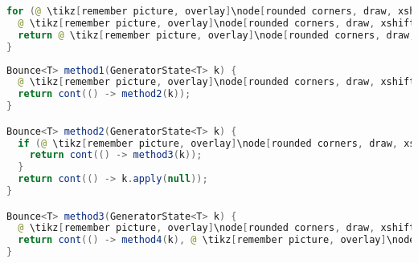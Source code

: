 \pagebreak

\begin{center}
\begin{mdframed}[topline=true]
\begin{minipage}[t]{0.4\textwidth}
\begin{lstlisting}[language=Java, numbers=none, breaklines=true]
for (@ \tikz[remember picture, overlay]\node[rounded corners, draw, xshift=-0.1cm, inner sep=5pt, anchor=west, yshift=0.1cm] {Init}; \hspace*{0.6cm}@; @ \tikz[remember picture, overlay]\node[rounded corners, draw, xshift=-0.2cm, inner sep=5pt, anchor=west, yshift=0.1cm] {Feltétel}; \hspace*{1.0cm}@; @ \tikz[remember picture, overlay]\node[rounded corners, draw, xshift=-0.2cm, inner sep=5pt, anchor=west, yshift=0.1cm] {Frissít}; \vspace*{0.3cm} \hspace*{0.9cm}@) {
  @ \tikz[remember picture, overlay]\node[rounded corners, draw, xshift=-0.1cm, inner sep=5pt, anchor=west] {Kódrészlet}; \vspace*{0.5cm} @ 
  return @ \tikz[remember picture, overlay]\node[rounded corners, draw, xshift=-0.1cm, inner sep=5pt, anchor=west, yshift=0.1cm] {Kifejezés}; \vspace*{0.3cm} @
}
\end{lstlisting}
\end{minipage} 
\begin{minipage}[t]{0.6\textwidth}
\begin{lstlisting}[language=Java, numbers=none, breaklines=true]
Bounce<T> method1(GeneratorState<T> k) {
  @ \tikz[remember picture, overlay]\node[rounded corners, draw, xshift=-0.1cm, inner sep=5pt, anchor=west] {Init}; \vspace*{0.3cm} @
  return cont(() -> method2(k));
}

Bounce<T> method2(GeneratorState<T> k) {
  if (@ \tikz[remember picture, overlay]\node[rounded corners, draw, xshift=-0.1cm, inner sep=5pt, anchor=west, yshift=0.1cm] {Feltétel}; \hspace*{1.04cm} @) {
    return cont(() -> method3(k));
  }
  return cont(() -> k.apply(null));
}

Bounce<T> method3(GeneratorState<T> k) {
  @ \tikz[remember picture, overlay]\node[rounded corners, draw, xshift=-0.1cm, inner sep=5pt, anchor=west] {Kódrészlet}; \vspace*{0.3cm} @
  return cont(() -> method4(k), @ \tikz[remember picture, overlay]\node[rounded corners, draw, xshift=-0.1cm, inner sep=5pt, anchor=west, yshift=0.1cm] {Kifejezés}; \vspace*{0.2cm} \hspace*{1.2cm} @);
}


\end{lstlisting}
\end{minipage}
\end{mdframed}
\end{center}
